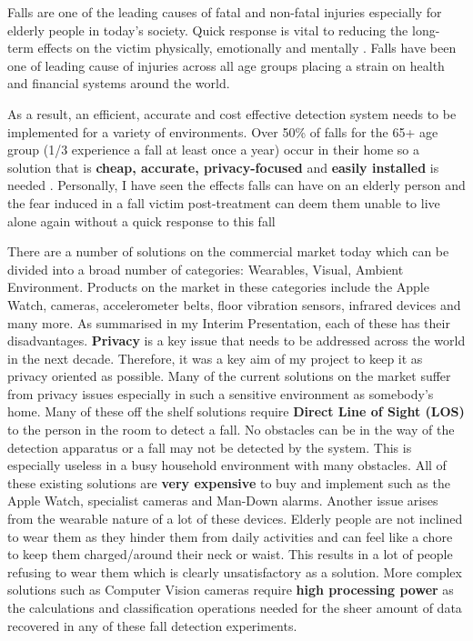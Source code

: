 Falls are one of the leading causes of fatal and non-fatal injuries especially for elderly people in today's society. Quick response is vital to reducing the long-term effects on the victim physically, emotionally and mentally \citep{stokesFall}. Falls have been one of leading cause of injuries across all age groups placing a strain on health and financial systems around the world. \par
As a result, an efficient, accurate and cost effective detection system needs to be implemented for a variety of environments. Over 50\% of falls for the 65+ age group (1/3 experience a fall at least once a year) occur in their home so a solution that is \textbf{cheap, accurate, privacy-focused} and \textbf{easily installed} is needed \citep{medicalFall, stokesFall}. 
Personally, I have seen the effects falls can have on an elderly person and the fear induced in a fall victim post-treatment can deem them unable to live alone again without a quick response to this fall \citep{fearFall, dangerousFalls} \par
There are a number of solutions on the commercial market today which can be divided into a broad number of categories: Wearables, Visual, Ambient Environment. Products on the market in these categories include the Apple Watch, cameras, accelerometer belts, floor vibration sensors, infrared devices and many more. As summarised in my Interim Presentation, each of these has their disadvantages. \textbf{Privacy} is a key issue that needs to be addressed across the world in the next decade. Therefore, it was a key aim of my project to keep it as privacy oriented as possible. Many of the current solutions on the market suffer from privacy issues especially in such a sensitive environment as somebody's home. Many of these off the shelf solutions require \textbf{Direct Line of Sight (LOS)} to the person in the room to detect a fall. No obstacles can be in the way of the detection apparatus or a fall may not be detected by the system. This is especially useless in a busy household environment with many obstacles. All of these existing solutions are \textbf{very expensive} to buy and implement such as the Apple Watch, specialist cameras and Man-Down alarms. Another issue arises from the wearable nature of a lot of these devices. Elderly people are not inclined to wear them as they hinder them from daily activities and can feel like a chore to keep them charged/around their neck or waist. This results in a lot of people refusing to wear them which is clearly unsatisfactory as a solution. More complex solutions such as Computer Vision cameras require \textbf{high processing power} as the calculations and classification operations needed for the sheer amount of data recovered in any of these fall detection experiments. \par
